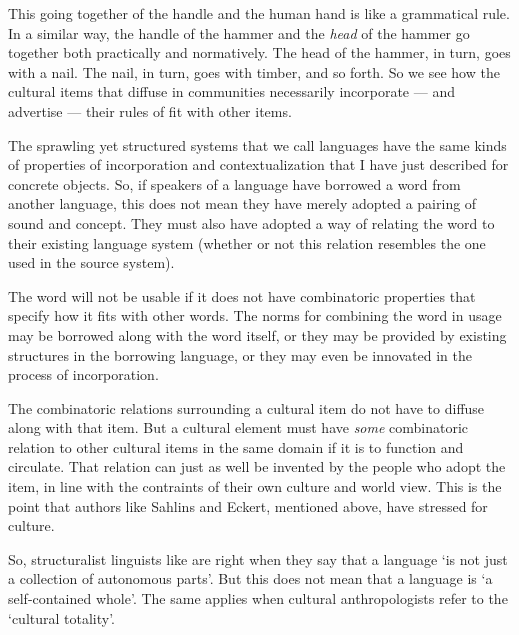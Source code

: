 This going together of the handle and the human hand is like a grammatical 
rule. In a similar way, the handle of the hammer and the \textit{head} of the 
hammer go together both 
practically and normatively. The head of the hammer, in turn, goes with a nail. The nail, in turn, goes with timber, and so forth. So we see how the cultural items that diffuse in communities necessarily 
incorporate --- and advertise --- their rules of fit with other items. 



The sprawling yet structured systems that we call languages have the same kinds of properties of incorporation and contextualization that I 
have just described for concrete objects. So, if speakers of a 
language have borrowed a word from another language, this does not mean they have 
merely adopted a pairing of sound and concept. They must also have adopted a way of relating the word to their existing language system 
(whether or not this relation resembles the one used in the source 
system). 



The word will not be usable if it does not have combinatoric properties that specify how it fits with other words. 
The norms for combining the word in usage may be borrowed along with the 
word itself, or they may be provided by existing structures in the borrowing 
language, or they may even be innovated in the process of incorporation. 



The combinatoric relations surrounding a cultural item 
do not have to diffuse along with that item. But a cultural 
element must have \textit{some} 
combinatoric relation to other cultural items in the same domain if it is to function and circulate. That relation can just as well be invented by the people who adopt the item, in line with the contraints of their own culture and world view. This 
is the point that authors like Sahlins and Eckert, mentioned above, 
have stressed for culture.



So, structuralist linguists like \citet[1]{donegan_rhythm_1983} are right when they 
say that a language \textquoteleft is not just a collection of autonomous parts'. But
this does not mean that a language is \textquoteleft a self-contained 
whole'. The same applies when cultural anthropologists 
refer to the \textquoteleft cultural totality'. 



